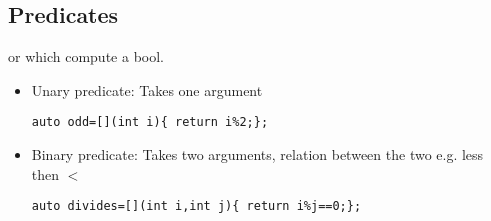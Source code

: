 \subsection{Predicates}
 or  which compute a bool.
\begin{itemize}
\item Unary predicate: 
Takes one argument
\begin{lstlisting}
auto odd=[](int i){ return i%2;};
\end{lstlisting}
\item Binary predicate:
Takes two arguments, relation between the two e.g. less then $<$
\begin{lstlisting}
auto divides=[](int i,int j){ return i%j==0;};
\end{lstlisting}
\end{itemize}
